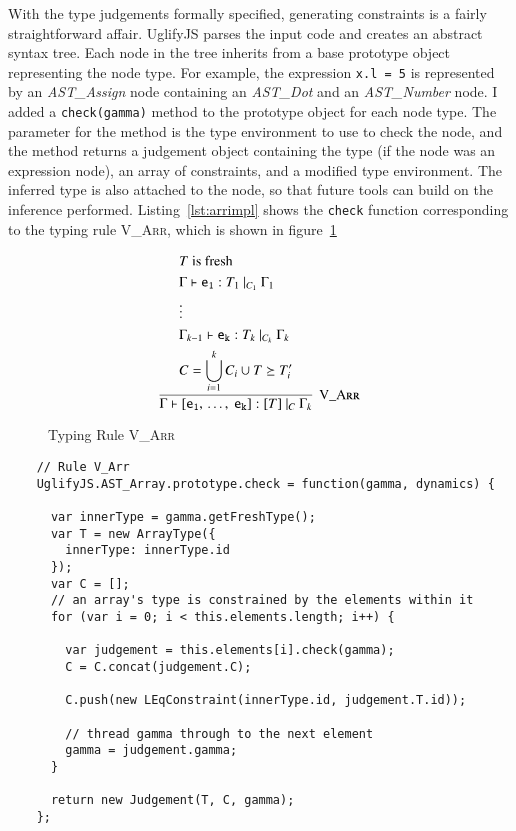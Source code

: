 \documentclass[12pt,a4paper,twoside,openright]{report}
\theoremstyle{definition}
\theoremstyle{dotless}
\newcommand*{\js}{\texttt}
\begin{document}
With the type judgements formally specified, generating constraints is a fairly
straightforward affair.  UglifyJS parses the input code and creates an abstract
syntax tree. Each node in the tree inherits from a base prototype object
representing the node type.  For example, the expression \js{x.l = 5} is
represented by an \textit{AST\_Assign} node containing an \textit{AST\_Dot} and
an \textit{AST\_Number} node.  I added a \js{check(gamma)} method to the
prototype object for each node type. The parameter for the method is the type
environment to use to check the node, and the method returns a judgement object
containing the type (if the node was an expression node), an array of
constraints, and a modified type environment. The inferred type is also
attached to the node, so that future tools can build on the inference
performed. Listing~\ref{lst:arrimpl} shows the \js{check} function
corresponding to the typing rule \textsc{V\_Arr}, which is shown in figure~\ref{fig:arrrule}
\begin{figure}[t]
  $$\infer[\textsc{V\_Arr}]{
  	\Gamma\vdash\mathtt{[e_1,\, \ldots,\ e_k]}:[T]\ |_C\ \Gamma_k	
  }{ 
	\begin{split}
	  &T \textrm{ is fresh} \\
	  &\Gamma\vdash \mathtt{e_1}:T_1\ |_{C_1}\ \Gamma_1 \\
	  &\vdots \\
	  &\Gamma_{k-1}\vdash \mathtt{e_k}:T_k\ |_{C_k}\ \Gamma_k \\
	  &C=\bigcup_{i=1}^kC_i \cup {T \succeq T_i'}
	\end{split}	  
  }$$
  \label{fig:arrrule}
  \caption{Typing Rule \textsc{V\_Arr}}
\end{figure}
\begin{program}[t]
  \begin{verbatim}
    // Rule V_Arr
    UglifyJS.AST_Array.prototype.check = function(gamma, dynamics) {

      var innerType = gamma.getFreshType();
      var T = new ArrayType({
        innerType: innerType.id
      });
      var C = [];
      // an array's type is constrained by the elements within it
      for (var i = 0; i < this.elements.length; i++) {

        var judgement = this.elements[i].check(gamma);
        C = C.concat(judgement.C);

        C.push(new LEqConstraint(innerType.id, judgement.T.id));

        // thread gamma through to the next element
        gamma = judgement.gamma;
      }

      return new Judgement(T, C, gamma);
    };
  \end{verbatim}
  \caption{The implementation of \textsc{V\_Arr}}\label{lst:arrimpl}
\end{program}
\end{document}
